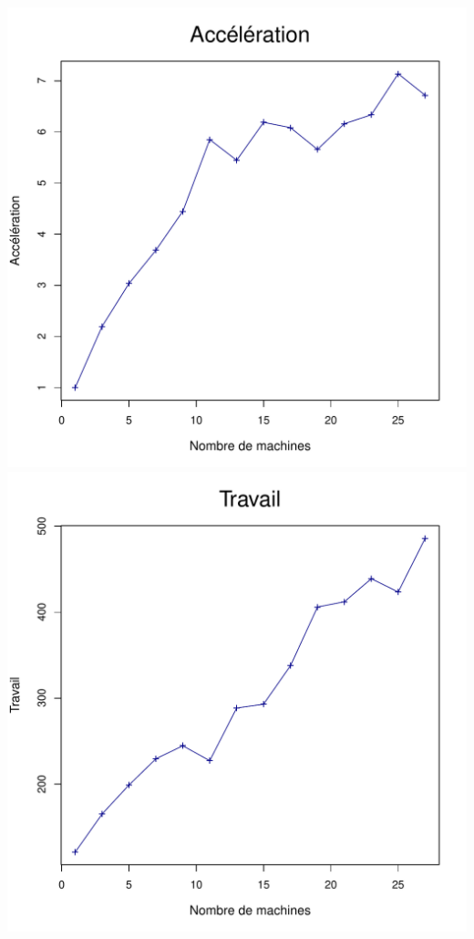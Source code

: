 \documentclass[a4paper, 11pt, titlepage]{article}
\begin{document}
\begin{center}
    \includegraphics[scale=0.45]{res/sujet_makefiles_blender_259_Makefile_nth1_acc.pdf}
    \includegraphics[scale=0.45]{res/sujet_makefiles_blender_259_Makefile_nth1_work.pdf}
\end{center}
\end{document}

